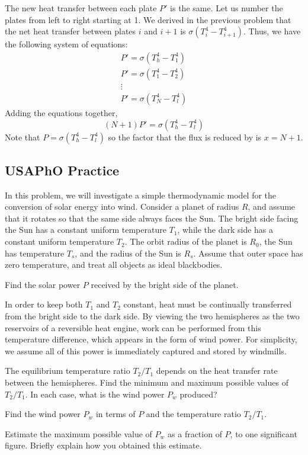 \documentclass[11pt]{scrartcl}
\begin{document}
\begin{sol}
    The new heat transfer between each plate $P'$ is the same. Let us number the plates from left to right starting at 1. We derived in the previous problem that the net heat transfer between plates $i$ and $i+1$ is $\sigma(T_i^4-T_{i+1}^4)$. Thus, we have the following system of equations: \begin{gather*}
        P' = \sigma(T_h^4-T_1^4)\\
        P'=\sigma(T_1^4-T_2^4)\\
        \vdots\\
        P'=\sigma(T_N^4-T_l^4)
    \end{gather*}Adding the equations together, $$(N+1)P'=\sigma(T_h^4-T_l^4)$$Note that $P=\sigma(T_h^4-T_l^4)$ so the factor that the flux is reduced by is $x=\boxed{N+1}.$
\end{sol}

\subsection{USAPhO Practice}

\begin{prob}[USAPhO 2019 A2]
    In this problem, we will investigate a simple thermodynamic model for the conversion of solar energy into wind. Consider a planet of radius $R$, and assume that it rotates so that the same side always faces the Sun. The bright side facing the Sun has a constant uniform temperature $T_1$, while the dark side has a constant uniform temperature $T_2$. The orbit radius of the planet is $R_0$, the Sun has temperature $T_s$, and the radius of the Sun is $R_s$. Assume that outer space has zero temperature, and treat all objects as ideal blackbodies.
    \begin{anum}
        \item Find the solar power $P$ received by the bright side of the planet.
    \end{anum}
    In order to keep both $T_1$ and $T_2$ constant, heat must be continually transferred from the bright side to the dark side. By viewing the two hemispheres as the two reservoirs of a reversible heat engine, work can be performed from this temperature difference, which appears in the form of wind power. For simplicity, we assume all of this power is immediately captured and stored by windmills.
    \begin{anum}\addtocounter{enumi}{1}
        \item The equilibrium temperature ratio $T_2/T_1$ depends on the heat transfer rate between the hemispheres. Find the minimum and maximum possible values of $T_2/T_1$. In each case, what is the wind power $P_w$ produced?
        \item Find the wind power $P_w$ in terms of $P$ and the temperature ratio $T_2/T_1$.
        \item Estimate the maximum possible value of $P_w$ as a fraction of $P$, to one significant figure. Briefly explain how you obtained this estimate.
    \end{anum}

\end{prob}
\end{document}
